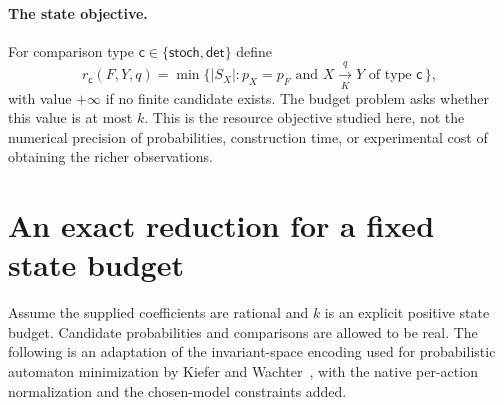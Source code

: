 \documentclass[11pt]{article}
\begin{document}
\paragraph{The state objective.}
For comparison type $\mathsf{c}\in\{\mathsf{stoch},\mathsf{det}\}$ define
\[
 r_{\mathsf{c}}(F,Y,q)=\min\{|S_X|:p_X=p_F\text{ and }X\xrightarrow[K]{q}Y
 \text{ of type }\mathsf{c}\,\},
\]
with value $+\infty$ if no finite candidate exists. The budget problem asks whether this value is at most $k$. This is the resource objective studied here, not the numerical precision of probabilities, construction time, or experimental cost of obtaining the richer observations.

\section{An exact reduction for a fixed state budget}
\label{sec:etr}

Assume the supplied coefficients are rational and $k$ is an explicit positive state budget. Candidate probabilities and comparisons are allowed to be real. The following is an adaptation of the invariant-space encoding used for probabilistic automaton minimization by Kiefer and Wachter~\cite[Section 4.2]{KW2014}, with the native per-action normalization and the chosen-model constraints added.
\end{document}
